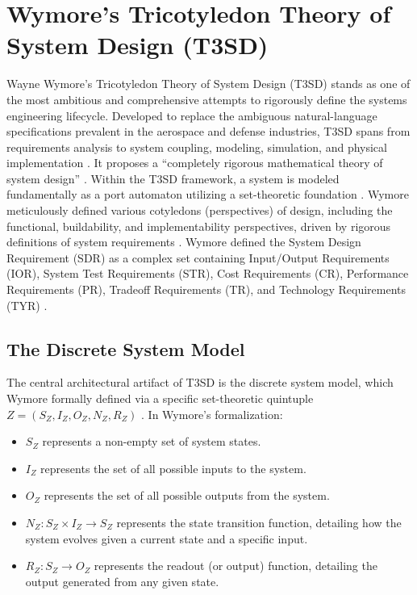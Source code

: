\documentclass[11pt]{article}
\begin{document}
\section{Wymore's Tricotyledon Theory of System Design (T3SD)}

Wayne Wymore's Tricotyledon Theory of System Design (T3SD) stands as one of the most ambitious and comprehensive attempts to rigorously define the systems engineering lifecycle. Developed to replace the ambiguous natural-language specifications prevalent in the aerospace and defense industries, T3SD spans from requirements analysis to system coupling, modeling, simulation, and physical implementation \parencite{Ref11, Ref12, Ref14}. It proposes a ``completely rigorous mathematical theory of system design'' \parencite{Ref12}. Within the T3SD framework, a system is modeled fundamentally as a port automaton utilizing a set-theoretic foundation \parencite{Ref11}. Wymore meticulously defined various cotyledons (perspectives) of design, including the functional, buildability, and implementability perspectives, driven by rigorous definitions of system requirements \parencite{Ref36}. Wymore defined the System Design Requirement (SDR) as a complex set containing Input/Output Requirements (IOR), System Test Requirements (STR), Cost Requirements (CR), Performance Requirements (PR), Tradeoff Requirements (TR), and Technology Requirements (TYR) \parencite{Ref11, Ref14, Ref36}.\subsection{The Discrete System Model}
The central architectural artifact of T3SD is the discrete system model, which Wymore formally defined via a specific set-theoretic quintuple $Z = (S_Z, I_Z, O_Z, N_Z, R_Z)$ \parencite{Ref27}. In Wymore's formalization:
\begin{itemize}
 \item $S_Z$ represents a non-empty set of system states.
 \item $I_Z$ represents the set of all possible inputs to the system.
 \item $O_Z$ represents the set of all possible outputs from the system.
 \item $N_Z: S_Z \times I_Z \to S_Z$ represents the state transition function, detailing how the system evolves given a current state and a specific input.
 \item $R_Z: S_Z \to O_Z$ represents the readout (or output) function, detailing the output generated from any given state.
\end{itemize}
\end{document}

